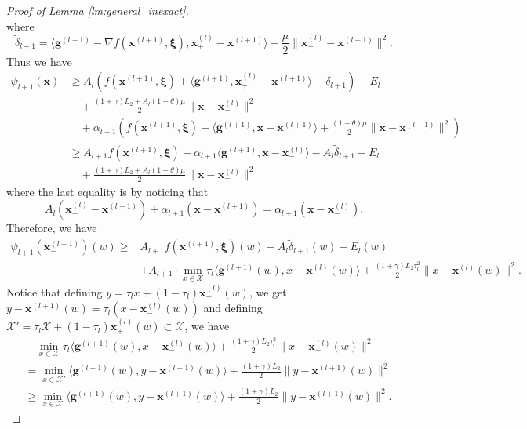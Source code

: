 \documentclass[10pt,a4paper]{amsart}
\newcommand{\bx}{\boldsymbol{\xi}}
\newcommand{\mb}{\mathbf}
\newcommand{\mc}{\mathcal}
\begin{document}
\begin{proof}[Proof of Lemma \ref{lm:general_inexact}]
\begin{displaymath}
\end{displaymath}
where
\begin{displaymath}
    \tilde{\delta}_{l+1} = \langle \mb g^{(l+1)} - \nabla f(\mb x^{(l+1)},\bx) ,\mb x_+^{(l)}-\mb x^{(l+1)}\rangle-\frac{\mu}{2}\|\mb x_+^{(l)} - \mb x^{(l+1)}\|^2.
\end{displaymath}
Thus we have
\begin{align*}
    \psi_{l+1}(\mb x) &\geq  A_l(f(\mb x^{(l+1)},\bx) + \langle \mb g^{(l+1)},\mb x_+^{(l)}-\mb x^{(l+1)}\rangle - \tilde{\delta}_{l+1}) - E_l \\
    &\quad + \frac{(1+\gamma)L_2+A_l(1-\theta)\mu}{2}\|\mb x-\mb x_-^{(l)}\|^2\\
    &\quad +\alpha_{l+1}(f(\mb x^{(l+1)},\bx) +\langle \mb g^{(l+1)},\mb x-\mb x^{(l+1)}\rangle + \frac{(1-\theta)\mu}{2}\|\mb x - \mb x^{(l+1)}\|^2)\\
    &  \geq A_{l+1}f(\mb x^{(l+1)},\bx) + \alpha_{l+1}\langle \mb g^{(l+1)},\mb x-\mb x_-^{(l)}\rangle  - A_l\tilde{\delta}_{l+1} - E_l \\
    &\quad + \frac{(1+\gamma)L_2+A_l(1-\theta)\mu}{2}\|\mb x-\mb x_-^{(l)}\|^2
\end{align*}
where the last equality is by noticing that
\begin{displaymath}
    A_l(\mb x_+^{(l)}-\mb x^{(l+1)}) + \alpha_{l+1}(\mb x-\mb x^{(l+1)}) = \alpha_{l+1}(\mb x-\mb x_-^{(l)}).
\end{displaymath}
Therefore, we have
\begin{align*}
    \psi_{l+1}(\mb x_-^{(l+1)})(w) \geq  & A_{l+1}f(\mb x^{(l+1)},\bx) (w)  - A_l\tilde{\delta}_{l+1}(w) - E_l(w) \\
    &+ A_{l+1}\cdot \min_{x\in \mc X}  \tau_{l}\langle \mb g^{(l+1)}(w),x-\mb x_-^{(l)}(w)\rangle+ \frac{(1+\gamma)L_2\tau_l^2}{2}\|x-\mb x_-^{(l)}(w)\|^2.
\end{align*}
Notice that defining $y = \tau_l x + (1-\tau_l)\mb x_+^{(l)}(w)$, we get $y-\mb x^{(l+1)}(w) = \tau_l(x-\mb x_-^{(l)}(w))$ and defining $\mc X' = \tau_l \mc X+ (1-\tau_l)\mb x_+^{(l)}(w) \subset \mc X$, we have
\begin{align*}
      &\quad \min_{x\in \mc X}  \tau_{l}\langle \mb g^{(l+1)}(w),x-\mb x_-^{(l)}(w)\rangle+ \frac{(1+\gamma)L_2\tau_l^2}{2}\|x-\mb x_-^{(l)}(w)\|^2 \\
    & = \min_{x\in \mc X'}  \langle \mb g^{(l+1)}(w),y-\mb x^{(l+1)}(w)\rangle+ \frac{(1+\gamma)L_2}{2}\|y-\mb x^{(l+1)}(w)\|^2\\
    &\geq \min_{x\in \mc X}   \langle \mb g^{(l+1)}(w),y-\mb x^{(l+1)}(w)\rangle+ \frac{(1+\gamma)L_2}{2}\|y-\mb x^{(l+1)}(w)\|^2.

\end{align*}
\end{proof}
\end{document}
